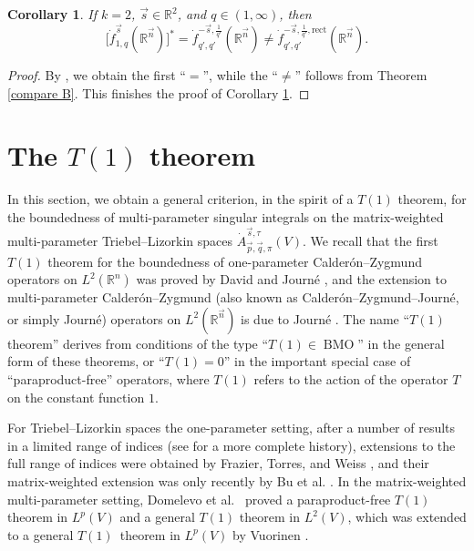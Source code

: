 \documentclass[11pt, reqno]{amsart}
\newtheorem{corollary}[theorem]{Corollary}
\theoremstyle{definition}
\theoremstyle{remark}
\numberwithin{equation}{section}
\newcommand{\R}{\mathbb R}
\newcommand{\vn}{\vec n}
\newcommand{\vp}{\vec p}
\newcommand{\vq}{\vec q}
\newcommand{\vs}{\vec s}
\newcommand{\Atau}{\dot A^{\vs,\tau}_{\vp,\vq,\pi}}
\newcommand{\BMO}{\operatorname{BMO}}
\begin{document}
\begin{corollary} \label{dual}
If $k=2$, $\vec s\in \mathbb R^2$, and $q\in(1,\infty)$, then
$$
\big[\dot f_{1,q}^{\vec s}(\mathbb R^{\vec n})\big]^*
=\dot f_{q',q'}^{-\vec s,\frac1{q'}}(\mathbb R^{\vec n})
\neq \dot f_{q',q'}^{-\vec s,\frac1{q'},\mathrm{rect}}(\mathbb R^{\vec n}).
$$
\end{corollary}

\begin{proof}
By \cite[Theorem 4.5]{DingZhu17}, we obtain the first ``$=$'',
while the ``$\neq$'' follows from Theorem \ref{compare B}.
This finishes the proof of Corollary \ref{dual}.
\end{proof}

\section{The $T(1)$ theorem}\label{sec:CZO}

In this section, we obtain a general criterion, in the spirit of a $T(1)$ theorem, for the boundedness of multi-parameter singular integrals on the matrix-weighted multi-parameter Triebel--Lizorkin spaces $\Atau(V)$. We recall that the first $T(1)$ theorem for the boundedness of one-parameter Calder\'on--Zygmund operators on $L^2(\R^n)$ was proved by David and Journ\'e \cite{DJ84}, and the extension to multi-parameter Calder\'on--Zygmund (also known as Calder\'on--Zygmund--Journ\'e, or simply Journ\'e) operators on $L^2(\R^{\vn})$  is due to Journ\'e \cite{Journe}. The name ``$T(1)$ theorem'' derives from conditions of the type ``$T(1)\in\BMO$'' in the general form of these theorems, or ``$T(1)=0$'' in the important special case of ``paraproduct-free'' operators, where $T(1)$ refers to the action of the operator $T$ on the constant function $1$.

For Triebel--Lizorkin spaces the one-parameter setting, after a number of results in a limited range of indices (see \cite[pp.\ 222--223]{HNVW3} for a more complete history), extensions to the full range of indices were  obtained by Frazier, Torres, and Weiss \cite{FTW,tor}, and their matrix-weighted extension was only recently by Bu et al. \cite{BHYY:1c}. 
 In the matrix-weighted multi-parameter setting, Domelevo et al.~\cite{DKPS} proved a paraproduct-free $T(1)$ theorem in $L^p(V)$ and a general $T(1)$ theorem in $L^2(V)$, which was extended to a general $T(1)$ theorem in $L^p(V)$ by Vuorinen \cite{Vuo24}.
\end{document}
